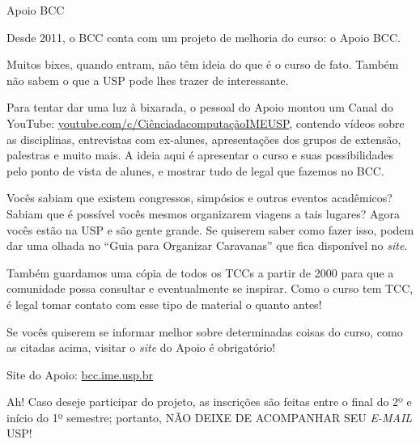 \begin{subsubsecao}{Apoio BCC}

Desde 2011, o BCC conta com um projeto de melhoria do curso: o Apoio BCC.

Muitos bixes, quando entram, não têm ideia do que é o curso de fato. Também não
sabem o que a USP pode lhes trazer de interessante.

Para tentar dar uma luz à bixarada, o pessoal do Apoio montou um Canal do YouTube:
\url{youtube.com/c/CiênciadacomputaçãoIMEUSP}, contendo vídeos sobre as disciplinas,
entrevistas com ex-alunes, apresentações dos grupos de extensão, palestras e muito
mais. A ideia aqui é apresentar o curso e suas possibilidades pelo ponto de vista
de alunes, e mostrar tudo de legal que fazemos no BCC.

Vocês sabiam que existem congressos, simpósios e outros eventos acadêmicos?
Sabiam que é possível vocês mesmos organizarem viagens a tais lugares? Agora
vocês estão na USP e são gente grande. Se quiserem saber como fazer isso, podem 
dar uma olhada no ``Guia para Organizar Caravanas'' que fica disponível 
no \textit{site}.

Também guardamos uma cópia de todos os TCCs a partir de 2000 para que a 
comunidade possa consultar e eventualmente se inspirar. Como o curso tem TCC, é 
legal tomar contato com esse tipo de material o quanto antes!

Se vocês quiserem se informar melhor sobre determinadas coisas do curso, como as
citadas acima, visitar o \textit{site} do Apoio é obrigatório!

Site do Apoio: \url{bcc.ime.usp.br}

Ah! Caso deseje participar do projeto, as inscrições são feitas entre
o final do 2º e início do 1º semestre; portanto, NÃO DEIXE DE ACOMPANHAR SEU
\textit{E-MAIL} USP!

\end{subsubsecao}
